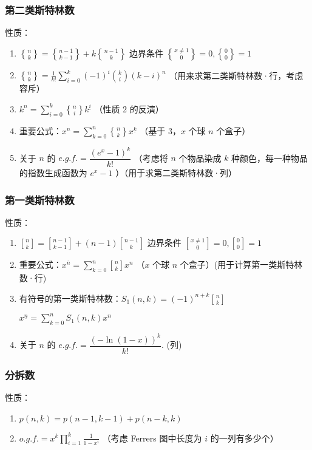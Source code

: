 \subsubsection{第二类斯特林数}

性质：
\begin{enumerate}
    \item ${n\brace k}={n-1\brace k-1}+k{n-1\brace k}$ 边界条件 ${x\neq 1\brace 0}=0,{0\brace 0}=1$
    \item ${n\brace k}=\frac{1}{k!}\sum\limits_{i=0}^{k}(-1)^i\binom{k}{i}(k-i)^{n}$ （用来求第二类斯特林数·行，考虑容斥）
    \item $k^n=\sum\limits_{i=0}^k {n\brace i} k^{\underline{i}}$ （性质 2 的反演）
    \item 重要公式：$x^n=\sum\limits_{k=0}^{n}{n\brace k}x^{\underline k}$ （基于 3，$x$ 个球 $n$ 个盒子）
    \item 关于 $n$ 的 $e.g.f.=\dfrac{(e^x-1)^k}{k!}$ （考虑将 $n$ 个物品染成 $k$ 种颜色，每一种物品的指数生成函数为 $e^x-1$ ）（用于求第二类斯特林数·列）
\end{enumerate}

\subsubsection{第一类斯特林数}

性质：
\begin{enumerate}
    \item ${n\brack k}={n-1\brack k-1}+(n-1){n-1\brack k}$ 边界条件 ${x\neq1\brack 0}=0,{0\brack 0}=1$
    \item 重要公式：$x^{\overline n}=\sum\limits_{k=0}^{n}{n\brack k}x^n$ （$x$ 个球 $n$ 个盒子）(用于计算第一类斯特林数·行)
    \item 有符号的第一类斯特林数：$S_1(n,k)=(-1)^{n+k}{n\brack k}$
    
    $x^{\underline n}=\sum\limits_{k=0}^{n}S_1(n,k)x^n$
    \item 关于 $n$ 的 $e.g.f.=\dfrac{(-\ln(1-x))^k}{k!}$. (列)
\end{enumerate}

\subsubsection{分拆数}

性质：
\begin{enumerate}
    \item $p(n,k)=p(n-1,k-1)+p(n-k,k)$
    \item $o.g.f. = x^k \prod\limits_{i=1}^k \frac{1}{1-x^i}$ （考虑 Ferrers 图中长度为 $i$ 的一列有多少个）
\end{enumerate}

